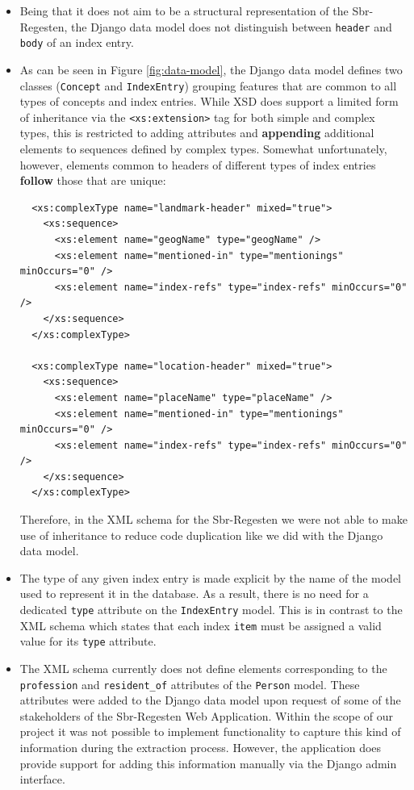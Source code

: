 \begin{itemize}
\item Being that it does not aim to be a structural representation of
  the Sbr-Regesten, the Django data model does not distinguish between
  \texttt{header} and \texttt{body} of an index entry.
\item As can be seen in Figure \ref{fig:data-model}, the Django data
  model defines two classes (\texttt{Concept} and \texttt{IndexEntry})
  grouping features that are common to all types of concepts and index
  entries. While XSD does support a limited form of inheritance via
  the \texttt{<xs:extension>} tag for both simple and complex types,
  this is restricted to adding attributes and \textbf{appending}
  additional elements to sequences defined by complex types. Somewhat
  unfortunately, however, elements common to headers of different
  types of index entries \textbf{follow} those that are unique:

\begin{verbatim}
  <xs:complexType name="landmark-header" mixed="true">
    <xs:sequence>
      <xs:element name="geogName" type="geogName" />
      <xs:element name="mentioned-in" type="mentionings" minOccurs="0" />
      <xs:element name="index-refs" type="index-refs" minOccurs="0" />
    </xs:sequence>
  </xs:complexType>

  <xs:complexType name="location-header" mixed="true">
    <xs:sequence>
      <xs:element name="placeName" type="placeName" />
      <xs:element name="mentioned-in" type="mentionings" minOccurs="0" />
      <xs:element name="index-refs" type="index-refs" minOccurs="0" />
    </xs:sequence>
  </xs:complexType>
\end{verbatim}

  Therefore, in the XML schema for the Sbr-Regesten we were not able
  to make use of inheritance to reduce code duplication like we did
  with the Django data model.
\item The type of any given index entry is made explicit by the name
  of the model used to represent it in the database. As a result,
  there is no need for a dedicated \texttt{type} attribute on the
  \texttt{IndexEntry} model. This is in contrast to the XML schema
  which states that each index \texttt{item} must be assigned a valid
  value for its \texttt{type} attribute.
\item The XML schema currently does not define elements corresponding
  to the \texttt{profession} and \texttt{resident\_of} attributes of
  the \texttt{Person} model. These attributes were added to the Django
  data model upon request of some of the stakeholders of the
  Sbr-Regesten Web Application. Within the scope of our project it was
  not possible to implement functionality to capture this kind of
  information during the extraction process. However, the application
  does provide support for adding this information manually via the
  Django admin interface.
\end{itemize}

